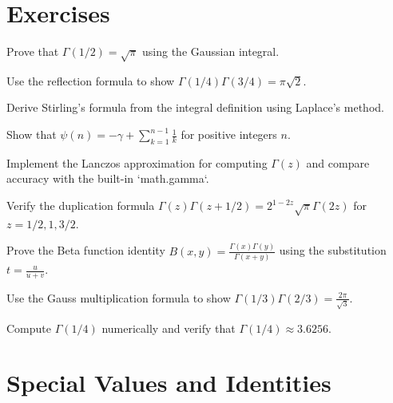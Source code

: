 \section{Exercises}

\begin{exercise}
Prove that $\Gamma(1/2) = \sqrt{\pi}$ using the Gaussian integral.
\end{exercise}

\begin{exercise}
Use the reflection formula to show $\Gamma(1/4)\Gamma(3/4) = \pi\sqrt{2}$.
\end{exercise}

\begin{exercise}
Derive Stirling's formula from the integral definition using Laplace's method.
\end{exercise}

\begin{exercise}
Show that $\psi(n) = -\gamma + \sum_{k=1}^{n-1} \frac{1}{k}$ for positive integers $n$.
\end{exercise}

\begin{exercise}[Computational]
Implement the Lanczos approximation for computing $\Gamma(z)$ and compare accuracy with the built-in `math.gamma`.
\end{exercise}

\begin{exercise}
Verify the duplication formula $\Gamma(z)\Gamma(z+1/2) = 2^{1-2z}\sqrt{\pi}\Gamma(2z)$ for $z = 1/2, 1, 3/2$.
\end{exercise}

\begin{exercise}
Prove the Beta function identity $B(x,y) = \frac{\Gamma(x)\Gamma(y)}{\Gamma(x+y)}$ using the substitution $t = \frac{u}{u+v}$.
\end{exercise}

\begin{exercise}
Use the Gauss multiplication formula to show $\Gamma(1/3)\Gamma(2/3) = \frac{2\pi}{\sqrt{3}}$.
\end{exercise}

\begin{exercise}
Compute $\Gamma(1/4)$ numerically and verify that $\Gamma(1/4) \approx 3.6256$.
\end{exercise}


\section{Special Values and Identities}

